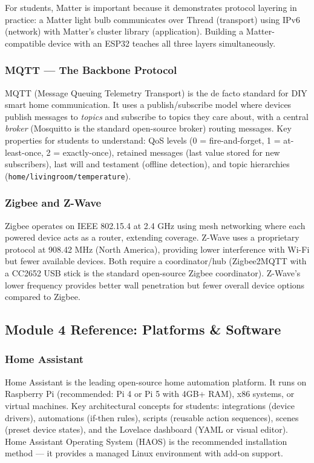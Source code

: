 \documentclass[11pt,letterpaper]{article}
\begin{document}
For students, Matter is important because it demonstrates protocol layering in practice: a Matter light bulb communicates over Thread (transport) using IPv6 (network) with Matter's cluster library (application). Building a Matter-compatible device with an ESP32 teaches all three layers simultaneously.

\subsubsection{MQTT --- The Backbone Protocol}

MQTT (Message Queuing Telemetry Transport) is the de facto standard for DIY smart home communication. It uses a publish/subscribe model where devices publish messages to \textit{topics} and subscribe to topics they care about, with a central \textit{broker} (Mosquitto is the standard open-source broker) routing messages. Key properties for students to understand: QoS levels (0 = fire-and-forget, 1 = at-least-once, 2 = exactly-once), retained messages (last value stored for new subscribers), last will and testament (offline detection), and topic hierarchies (\texttt{home/livingroom/temperature}).

\subsubsection{Zigbee and Z-Wave}

Zigbee operates on IEEE 802.15.4 at 2.4 GHz using mesh networking where each powered device acts as a router, extending coverage. Z-Wave uses a proprietary protocol at 908.42 MHz (North America), providing lower interference with Wi-Fi but fewer available devices. Both require a coordinator/hub (Zigbee2MQTT with a CC2652 USB stick is the standard open-source Zigbee coordinator). Z-Wave's lower frequency provides better wall penetration but fewer overall device options compared to Zigbee.

\subsection{Module 4 Reference: Platforms \& Software}

\subsubsection{Home Assistant}

Home Assistant is the leading open-source home automation platform. It runs on Raspberry Pi (recommended: Pi 4 or Pi 5 with 4GB+ RAM), x86 systems, or virtual machines. Key architectural concepts for students: integrations (device drivers), automations (if-then rules), scripts (reusable action sequences), scenes (preset device states), and the Lovelace dashboard (YAML or visual editor). Home Assistant Operating System (HAOS) is the recommended installation method --- it provides a managed Linux environment with add-on support.
\end{document}
